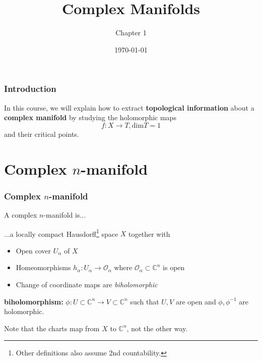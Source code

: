 \documentclass{beamer}
\title{Complex Manifolds}
\author{Chapter 1}
\institute{Complex Singularities}
\date{\today}
\begin{document}
\begin{frame}
\titlepage
\end{frame}


\begin{frame}
\frametitle{Introduction}

In this course, we will explain how to extract \textbf{topological information} about a \textbf{complex manifold} by studying the holomorphic maps \[f:X \to T, \text{dim}T = 1\] and their critical points.

\end{frame}



\section{Complex $n$-manifold}


\begin{frame}
\frametitle{Complex $n$-manifold}

A complex $n$-manifold is...

\phantom{?}

...a locally compact Hausdorff\footnote{Other definitions also assume 2nd countability.} space $X$ together with

\begin{itemize}
    \item Open cover $U_\alpha$ of $X$
    \item Homeomorphisms $h_\alpha: U_\alpha \to \mathcal{O}_\alpha$ where $\mathcal{O}_\alpha \subset \mathbb{C}^n$ is open
    \item Change of coordinate maps are \textit{biholomorphic}
\end{itemize}

\phantom{?}

\textbf{biholomorphism:} $\phi:U\subset \mathbb{C}^n \to V\subset\mathbb{C}^n$ such that $U,V$ are open and $\phi, \phi^{-1}$ are holomorphic.

\phantom{?}

Note that the charts map from $X$ to $\mathbb{C}^n$, not the other way.

\end{frame}
\end{document}
